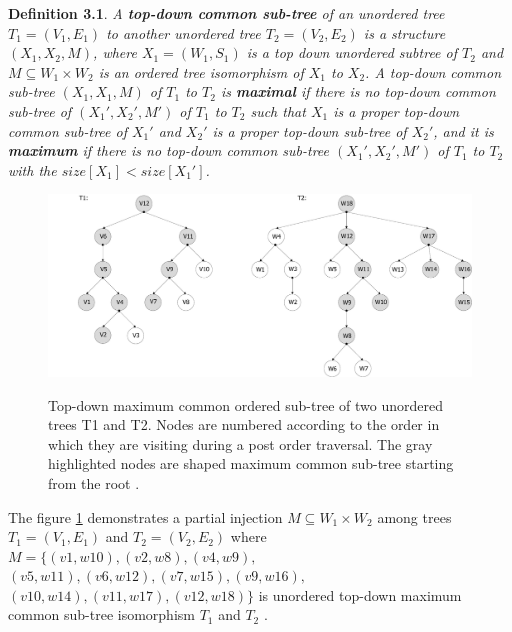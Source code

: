 \documentclass{report}
\begin{document}
\textbf{Definition 3.1}. \emph{
A \textbf{top-down common sub-tree} of an unordered tree $ T_{1} = ( V_{1}, E_{1})$ to another unordered tree $ T_{2} = ( V_{2}, E_{2})$ is a structure 
$ (X_{1}, X_{2}, M)$, where $ X_{1} = (W_{1}, S_{1})$ is a top down unordered subtree of $ T_{2}$ and $M \subseteq W_{1} \times  W_{2}$ is an ordered tree isomorphism of $ X_{1}$ to $ X_{2}$. A top-down common sub-tree $ (X_{1}, X_{1}, M)$ of $ T_{1}$ to $ T_{2}$ is \textbf{maximal} if there is no top-down common sub-tree of $ (X_{1}', X_{2}', M')$ of $ T_{1}$ to $ T_{2}$ such that $ X_{1}$  is a proper top-down common sub-tree of $ X_{1}'$ and $ X_{2}'$ is a proper top-down sub-tree of $ X_{2}'$, and it is \textbf{maximum} if there is no top-down common sub-tree $ (X_{1}', X_{2}', M')$  of $ T_{1}$ to $ T_{2}$ with the $size[X_{1}] < size[X_{1}']$\cite{valiente}.
}

\begin{figure}[hb]
  \centering
  \includegraphics[scale=0.45]{Figures/algorithms/TD/top-down-max-common-example-adjusted.pdf}\\[0.1cm]
  \caption[Top-down maximum common ordered sub-tree of two unordered trees]{Top-down maximum common ordered sub-tree of two unordered trees T1 and T2. Nodes are numbered according to the order in which they are visiting during a post order traversal. The gray highlighted nodes are shaped maximum common sub-tree starting from the root \cite{valiente}.}
  \label{fig:top-down-max-common-example-adjusted}
\end{figure}

The figure \ref{fig:top-down-max-common-example-adjusted} demonstrates a partial injection $M \subseteq W_{1} \times  W_{2}$ among trees $ T_{1} = ( V_{1}, E_{1})$ and  $ T_{2} = ( V_{2}, E_{2})$ where $M  = \{ (v1,w10),  (v2,w8), (v4,w9), $ \\
$(v5,w11),  (v6,w12),  (v7,w15),  (v9,w16), $  $ (v10,w14),  (v11,w17),  (v12,w18)\}$ is unordered top-down maximum common sub-tree isomorphism $ T_{1}$ and $ T_{2 }$ \cite{valiente}.
\end{document}
